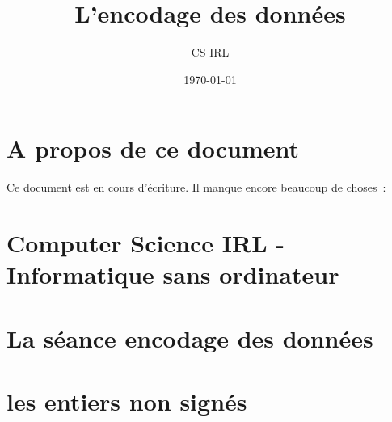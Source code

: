 \documentclass[11pt]{book}
\title{L'encodage des donn\'ees}
\author{CS IRL}
\date{\today}
\newcommand{\activity}[1]{\section{#1}}
\begin{document}
\maketitle
\section{A propos de ce document}
Ce document est en cours d'écriture. Il manque encore beaucoup de choses\ :
\listoftodos

\section{Computer Science IRL - Informatique sans ordinateur}

\section{La séance encodage des données}

\activity{les entiers non signés}


\end{document}
